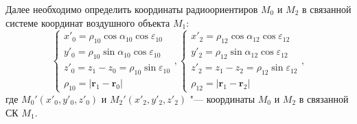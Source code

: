 \documentclass[a4paper,12pt]{article}
\begin{document}
Далее необходимо определить координаты радиоориентиров $M_0$ и $M_2$ в связанной системе координат
воздушного объекта $M_1$:
\begin{equation}
    \begin{cases}
        x'_0 = \rho_{10} \cos\alpha_{10} \cos\varepsilon_{10} \\
        y'_0 = \rho_{10} \sin\alpha_{10} \cos\varepsilon_{10} \\
        z'_0 = z_1 - z_0 = \rho_{10} \sin\varepsilon_{10} \\
        \rho_{10} = |\mathbf{r}_1 - \mathbf{r}_0|
    \end{cases},
    \begin{cases}
        x'_2 = \rho_{12} \cos\alpha_{12} \cos\varepsilon_{12} \\
        y'_2 = \rho_{12} \sin\alpha_{12} \cos\varepsilon_{12} \\
        z'_2 = z_1 - z_2 = \rho_{12} \sin\varepsilon_{12} \\
        \rho_{12} = |\mathbf{r}_1 - \mathbf{r}_2|
    \end{cases},
\end{equation}
где $M_0'\left(x'_0, y'_0, z'_0\right)$ и $M_2'\left(x'_2, y'_2, z'_2\right)$
"--- координаты $M_0$ и $M_2$ в связанной СК $M_1$.
\end{document}

